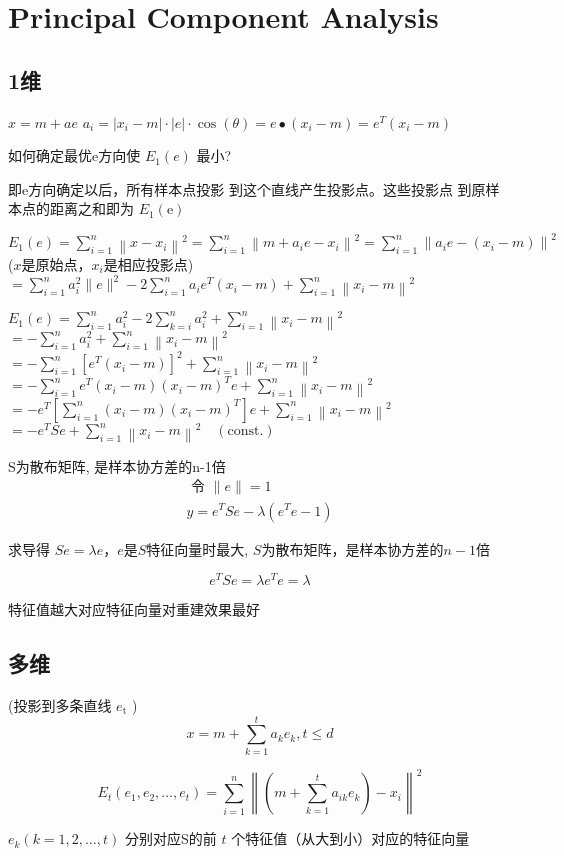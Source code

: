 \chapter{Principal Component Analysis}

\section{1维}

$ x=m+a e $
$ a_{i}=\left|x_{i}-m\right| \cdot|e| \cdot \cos (\theta)=e \bullet\left(x_{i}-m\right)=e^{T}\left(x_{i}-m\right) $

\begin{problem}
    如何确定最优e方向使 $ E_{1}(e) $ 最小?

    即e方向确定以后，所有样本点投影 到这个直线产生投影点。这些投影点 到原样本点的距离之和即为 $ E_{1}(\mathrm{e}) $
\end{problem}


$ E_{1}(e)=\sum_{i=1}^{n}\left\|x-x_{i}\right\|^{2}=\sum_{i=1}^{n}\left\|m+a_{i} e-x_{i}\right\|^{2}=\sum_{i=1}^{n}\left\|a_{i} e-\left(x_{i}-m\right)\right\|^{2} $ ($x$是原始点，$x_i$是相应投影点)
$ =\sum_{i=1}^{n} a_{i}^{2}\|e\|^{2}-2 \sum_{i=1}^{n} a_{i} e^{T}\left(x_{i}-m\right)+\sum_{i=1}^{n}\left\|x_{i}-m\right\|^{2} $

$ E_{1}(e)=\sum_{i=1}^{n} a_{i}^{2}-2 \sum_{k=i}^{n} a_{i}^{2}+\sum_{i=1}^{n}\left\|x_{i}-m\right\|^{2} $
$ =-\sum_{i=1}^{n} a_{i}^{2}+\sum_{i=1}^{n}\left\|x_{i}-m\right\|^{2} $
$ =-\sum_{i=1}^{n}\left[e^{T}\left(x_{i}-m\right)\right]^{2}+\sum_{i=1}^{n}\left\|x_{i}-m\right\|^{2} $
$ =-\sum_{i=1}^{n} e^{T}\left(x_{i}-m\right)\left(x_{i}-m\right)^{T} e+\sum_{i=1}^{n}\left\|x_{i}-m\right\|^{2} $
$ =-e^{T}\left[\sum_{i=1}^{n}\left(x_{i}-m\right)\left(x_{i}-m\right)^{T}\right] e+\sum_{i=1}^{n}\left\|x_{i}-m\right\|^{2} $
$ =-e^{T} S e+\sum_{i=1}^{n}\left\|x_{i}-m\right\|^{2} \quad (\text{const.}) $

S为散布矩阵, 是样本协方差的n-1倍
$$
\begin{array}{l}
\text { 令 }\|e\|=1 \\
y=e^{T} S e-\lambda\left(e^{T} e-1\right)
\end{array}
$$

求导得 $ S e=\lambda e $，$e$是$S$特征向量时最大, $S$为散布矩阵，是样本协方差的$n-1$倍

$$ e^{T} S e=\lambda e^{T} e=\lambda $$

特征值越大对应特征向量对重建效果最好

\section{多维}

(投影到多条直线 $ e_{\mathrm{t}} $ )
$$
x=m+\sum_{k=1}^{t} a_{k} e_{k}, t \leq d
$$

$$ E_{t}\left(e_{1}, e_{2}, \ldots, e_{t}\right)=\sum_{i=1}^{n}\left\|\left(m+\sum_{k=1}^{t} a_{i k} e_{k}\right)-x_{i}\right\|^{2} $$

$ e_{k}(k=1,2, \ldots, t) $ 分别对应S的前 $ t $ 个特征值（从大到小）对应的特征向量